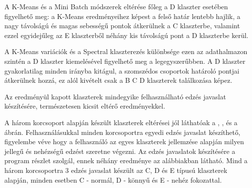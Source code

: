 A K-Means és a Mini Batch módszerek eltérése főleg a D klaszter esetében figyelhető meg: a K-Means eredményeihez képest a felső határ lentebb hajlik, a nagy távolságú és magas sebességű pontok átkerülnek a C klaszterbe, valamint ezzel egyidejűleg az E klaszterből néhány kis távolságú pont a D klaszterbe kerül.

A K-Means variációk és a Spectral klaszterezés különbsége ezen az adathalmazon szintén a D klaszter kiemelésével figyelhető meg a legegyszerűbben. A D klaszter gyakorlatilag minden irányba kitágul, a szomszédos csoportok határoló pontjai átkerülnek hozzá, ez alól kivételt csak a B C D klaszterek találkozása képez.

Az eredményül kapott klaszterek mindegyike felhasználható edzés javaslat készítésére, természetesen kicsit eltérő eredményekkel.

A három korcsoport alapján készült klaszterek eltérései jól láthatóak a , , és a  ábrán. Felhasználásukkal minden korcsoportra egyedi edzés javaslat készíthető, figyelembe véve hogy a felhasználó az egyes klaszterek jellemzése alapján milyen jellegű és nehézségű edzést szeretne végezni. Az edzés javaslatok készítésére a  program részlet szolgál, ennek néhány eredménye az alábbiakban látható. Mind a három korcsoportra 3 edzés javaslat készült az C, D és E típusú klaszterek alapján, minden esetben C - normál, D - könnyű és E - nehéz fokozattal.

